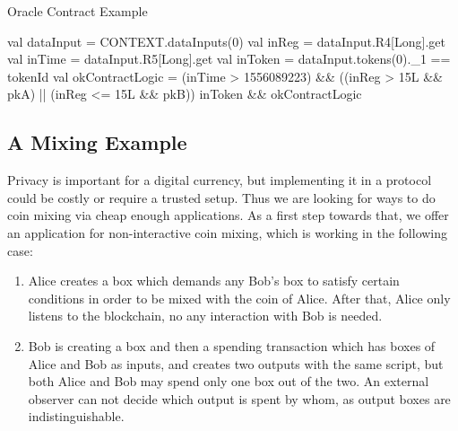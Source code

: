  \begin{algorithm}[H]
    \caption{Oracle Contract Example}
    \label{alg:oracle}
    \begin{algorithmic}[1]
        \State val dataInput = CONTEXT.dataInputs(0)
        \State val inReg = dataInput.R4[Long].get
        \State val inTime = dataInput.R5[Long].get
        \State val inToken = dataInput.tokens(0).\_1 == tokenId
        \State val okContractLogic = (inTime > 1556089223) \&\& ((inReg > 15L \&\& pkA) || (inReg <= 15L \&\& pkB))
        \State inToken \&\& okContractLogic
    \end{algorithmic}
 \end{algorithm}


\subsection{A Mixing Example}
 \label{sec:platform}

 Privacy is important for a digital currency, but implementing it in a protocol could be costly or require a trusted
 setup. Thus we are looking for ways to do coin mixing via cheap enough applications. As a first step towards that, we
 offer an application for non-interactive coin mixing, which is working in the following case:
 \begin{enumerate}
    \item{} Alice creates a box which demands any Bob's box to satisfy certain conditions in order to be mixed with
    the coin of Alice. After that, Alice only listens to the blockchain, no any interaction with Bob is needed.
    \item{} Bob is creating a box and then a spending transaction which has boxes of Alice and Bob as inputs,
     and creates two outputs with the same script, but both Alice and Bob may spend only one box out of the two.
     An external observer can not decide which output is spent by whom, as output boxes are indistinguishable.
 \end{enumerate}

